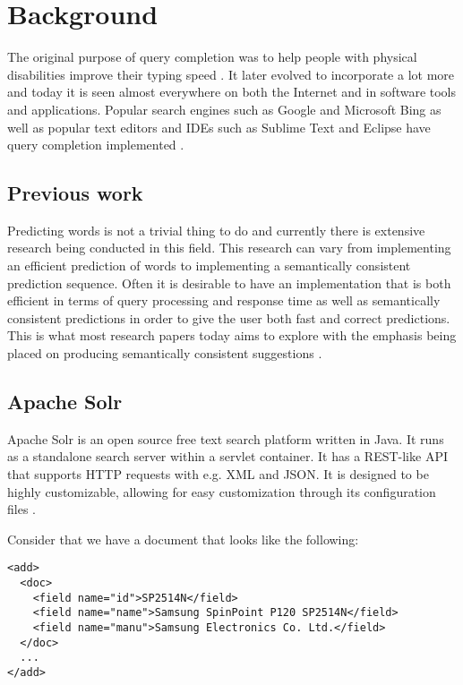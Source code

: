 \section{Background}\label{background}

The original purpose of query completion was to help people with physical disabilities improve their typing speed \cite{TAM}. It later evolved to incorporate a lot more and today it is seen almost everywhere on both the Internet and in software tools and applications. Popular search engines such as Google and Microsoft Bing \cite{GOOG, BING} as well as popular text editors and IDEs such as Sublime Text and Eclipse have query completion implemented \cite{ECLIPSE, SUBLIME}.

\subsection{Previous work}\label{previouswork}

Predicting words is not a trivial thing to do and currently there is extensive research being conducted in this field. This research can vary from implementing an efficient prediction of words to implementing a semantically consistent prediction sequence. Often it is desirable to have an implementation that is both efficient in terms of query processing and response time as well as semantically consistent predictions in order to give the user both fast and correct predictions. This is what most research papers today aims to explore with the emphasis being placed on producing semantically consistent suggestions \cite{MEI, CUCERZAN}. 

\subsection{Apache Solr}

Apache Solr is an open source free text search platform written in Java. It runs as a standalone search server within a servlet container. It has a REST-like API that supports HTTP requests with e.g. XML and JSON. It is designed to be highly customizable, allowing for easy customization through its configuration files \cite{SOLR}.

Consider that we have a document that looks like the following:

\begin{verbatim}
<add>
  <doc>
    <field name="id">SP2514N</field>
    <field name="name">Samsung SpinPoint P120 SP2514N</field>
    <field name="manu">Samsung Electronics Co. Ltd.</field>
  </doc>
  ...
</add>
\end{verbatim}

